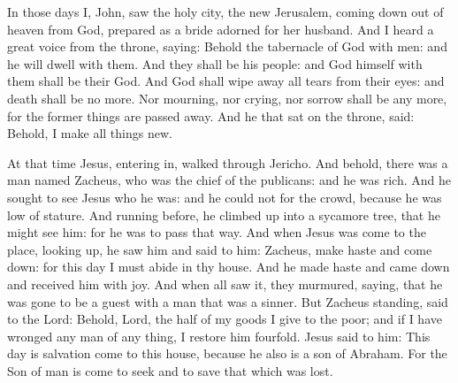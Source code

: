 


In those days
I, John, saw the holy city, the new Jerusalem, coming down out
of heaven from God, prepared as a bride adorned for her husband.
And I heard a great voice from the throne, saying: Behold the
tabernacle of God with men: and he will dwell with them.  And they shall
be his people: and God himself with them shall be their God.
And God shall wipe away all tears from their eyes: and death shall
be no more. Nor mourning, nor crying, nor sorrow shall be any more, for
the former things are passed away.
And he that sat on the throne, said: Behold, I make all things
new. %



At that time Jesus,
entering in, walked through Jericho.
And behold, there was a man named Zacheus, who was the chief of
the publicans: and he was rich.
And he sought to see Jesus who he was: and he could not for the
crowd, because he was low of stature.
And running before, he climbed up into a sycamore tree, that he
might see him: for he was to pass that way.
And when Jesus was come to the place, looking up, he saw him and
said to him: Zacheus, make haste and come down: for this day I must
abide in thy house.
And he made haste and came down and received him with joy.
And when all saw it, they murmured, saying, that he was gone to be
a guest with a man that was a sinner.
But Zacheus standing, said to the Lord: Behold, Lord, the half of
my goods I give to the poor; and if I have wronged any man of any thing,
I restore him fourfold.
Jesus said to him: This day is salvation come to this house,
because he also is a son of Abraham.
For the Son of man is come to seek and to save that which was
lost.





